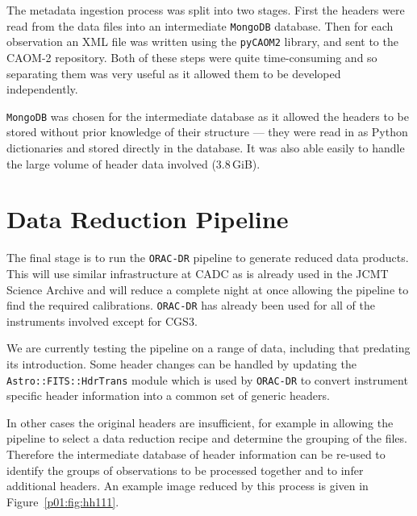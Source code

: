 \documentclass[11pt,twoside]{article}
\begin{document}
The metadata ingestion process was split into two stages.
First the headers were
read from the data files into an intermediate
\texttt{MongoDB} database.
Then for each observation an XML file was written
using the \texttt{pyCAOM2} library,
and sent to the CAOM-2 repository.
Both of these steps were quite time-consuming
and so separating them was very useful
as it allowed them to be developed
independently.

\texttt{MongoDB} was chosen for the intermediate database
as it allowed the
headers to be stored without prior knowledge of their structure
--- they were read in as Python dictionaries and
stored directly in the database.
It was also able easily to handle the large
volume of header data involved (3.8\,GiB).

\section{Data Reduction Pipeline}

The final stage is to run the \texttt{ORAC-DR} pipeline
\citep{1999ASPC..172...11E,2008AN....329..295C}
to generate reduced
data products.
This will use similar infrastructure at CADC as is already
used in the JCMT Science Archive
\citep{2011ASPC..442..203E}
and will reduce a complete night at once allowing
the pipeline to find the required calibrations.
\texttt{ORAC-DR} has already been used for all of the instruments
involved except for CGS3.

We are currently testing the pipeline on a range of data,
including that predating its introduction.
Some header changes can be handled by updating the
\texttt{Astro::FITS::HdrTrans} module
\citep[section 2.2]{2008AN....329..295C}
which is used by \texttt{ORAC-DR} to convert
instrument specific header information into
a common set of generic headers.

In other cases the original headers are insufficient,
for example in allowing the pipeline to
select a data reduction recipe and determine the
grouping of the files.
Therefore the intermediate database of header information
can be re-used to identify
the groups of observations to be processed together and to infer
additional headers.
An example image reduced by this process is given in
Figure~\ref{p01:fig:hh111}.

\end{document}
